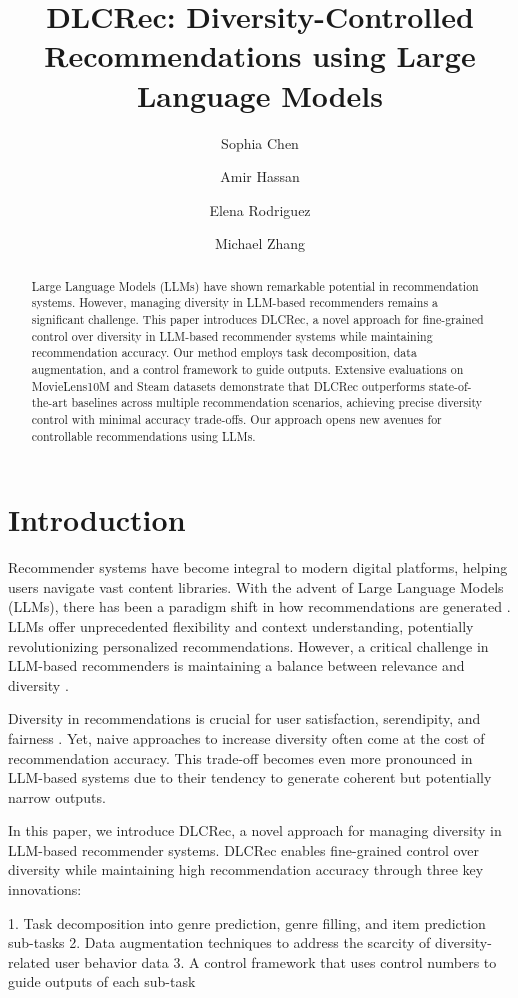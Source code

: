 \documentclass[12pt,letterpaper]{article}
\title{DLCRec: Diversity-Controlled Recommendations using Large Language Models}
\author{Sophia Chen \and Amir Hassan \and Elena Rodriguez \and Michael Zhang}
\begin{document}
\maketitle

\begin{abstract}
Large Language Models (LLMs) have shown remarkable potential in recommendation systems. However, managing diversity in LLM-based recommenders remains a significant challenge. This paper introduces DLCRec, a novel approach for fine-grained control over diversity in LLM-based recommender systems while maintaining recommendation accuracy. Our method employs task decomposition, data augmentation, and a control framework to guide outputs. Extensive evaluations on MovieLens10M and Steam datasets demonstrate that DLCRec outperforms state-of-the-art baselines across multiple recommendation scenarios, achieving precise diversity control with minimal accuracy trade-offs. Our approach opens new avenues for controllable recommendations using LLMs.
\end{abstract}

\section{Introduction}

Recommender systems have become integral to modern digital platforms, helping users navigate vast content libraries. With the advent of Large Language Models (LLMs), there has been a paradigm shift in how recommendations are generated \cite{zhang2023foundation}. LLMs offer unprecedented flexibility and context understanding, potentially revolutionizing personalized recommendations. However, a critical challenge in LLM-based recommenders is maintaining a balance between relevance and diversity \cite{abdollahpouri2020multistakeholder}.

Diversity in recommendations is crucial for user satisfaction, serendipity, and fairness \cite{kunaver2017diversity}. Yet, naive approaches to increase diversity often come at the cost of recommendation accuracy. This trade-off becomes even more pronounced in LLM-based systems due to their tendency to generate coherent but potentially narrow outputs.

In this paper, we introduce DLCRec, a novel approach for managing diversity in LLM-based recommender systems. DLCRec enables fine-grained control over diversity while maintaining high recommendation accuracy through three key innovations:

1. Task decomposition into genre prediction, genre filling, and item prediction sub-tasks
2. Data augmentation techniques to address the scarcity of diversity-related user behavior data
3. A control framework that uses control numbers to guide outputs of each sub-task
\end{document}
